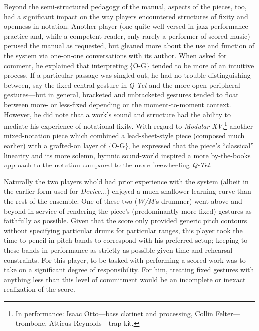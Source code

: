     Beyond the semi-structured pedagogy of the manual, aspects of the pieces, too, had a significant impact on the way players encountered structures of fixity and openness in notation. Another player (one quite well-versed in jazz performance practice and, while a competent reader, only rarely a performer of scored music) perused the manual as requested, but gleaned more about the use and function of the system via one-on-one conversations with its author. When asked for comment, he explained that interpreting \{O-G\} tended to be more of an intuitive process. If a particular passage was singled out, he had no trouble distinguishing between, say the fixed central gesture in \textit{Q-Tet} and the more-open peripheral gestures---but in general, bracketed and unbracketed gestures tended to float between more- or less-fixed depending on the moment-to-moment context. However, he did note that a work's sound and structure had the ability to mediate his experience of notational fixity. With regard to \textit{Modular XV},\footnote{In performance: Isaac Otto---bass clarinet and processing, Collin Felter---trombone, Atticus Reynolds---trap kit.} another mixed-notation piece which combined a lead-sheet-style piece (composed much earlier) with a grafted-on layer of \{O-G\}, he expressed that the piece's ``classical'' linearity and its more solemn, hymnic sound-world inspired a more by-the-books approach to the notation compared to the more freewheeling \textit{Q-Tet}.

    Naturally the two players who'd had prior experience with the system (albeit in the earlier form used for \textit{Device...}) enjoyed a much shallower learning curve than the rest of the ensemble. One of these two (\textit{W/M}'s drummer) went above and beyond in service of rendering the piece's (predominantly more-fixed) gestures as faithfully as possible. Given that the score only provided generic pitch contours without specifying particular drums for particular ranges, this player took the time to pencil in pitch bands to correspond with his preferred setup; keeping to these bands in performance as strictly as possible given time and rehearsal constraints. For this player, to be tasked with performing a scored work was to take on a significant degree of responsibility. For him, treating fixed gestures with anything less than this level of commitment would be an incomplete or inexact realization of the score. 

